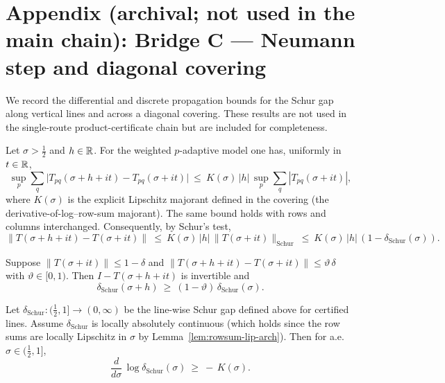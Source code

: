 
\section*{Appendix (archival; not used in the main chain): Bridge C — Neumann step and diagonal covering}

We record the differential and discrete propagation bounds for the Schur gap along vertical lines and across a diagonal covering. These results are not used in the single-route product-certificate chain but are included for completeness.

\begin{lemma}\label{lem:rowsum-lip-arch}
Let $\sigma>\tfrac12$ and $h\in\mathbb{R}$. For the weighted $p$-adaptive model one has, uniformly in $t\in\mathbb{R}$,
\[
  \sup_p \sum_q \big| T_{pq}(\sigma+h+it)-T_{pq}(\sigma+it)\big|\ \le\ K(\sigma)\,|h|\,\sup_p \sum_q |T_{pq}(\sigma+it)|,
\]
where $K(\sigma)$ is the explicit Lipschitz majorant defined in the covering (the derivative-of-log--row-sum majorant). The same bound holds with rows and columns interchanged. Consequently, by Schur's test,
\[
  \|T(\sigma+h+it)-T(\sigma+it)\|\ \le\ K(\sigma)\,|h|\,\|T(\sigma+it)\|_{\mathrm{Schur}}\ \le\ K(\sigma)\,|h|\,(1-\delta_{\mathrm{Schur}}(\sigma)).
\]
\end{lemma}

\begin{lemma}\label{lem:neumann-step}
Suppose $\|T(\sigma+it)\|\le 1-\delta$ and $\|T(\sigma+h+it)-T(\sigma+it)\|\le \vartheta\,\delta$ with $\vartheta\in[0,1)$. Then $I-T(\sigma+h+it)$ is invertible and
\[
  \delta_{\mathrm{Schur}}(\sigma+h)\ \ge\ (1-\vartheta)\,\delta_{\mathrm{Schur}}(\sigma).
\]
\end{lemma}

\begin{proposition}\label{prop:diff-bridgeC}
Let $\delta_{\mathrm{Schur}}:(\tfrac12,1]\to(0,\infty)$ be the line-wise Schur gap defined above for certified lines. Assume $\delta_{\mathrm{Schur}}$ is locally absolutely continuous (which holds since the row sums are locally Lipschitz in $\sigma$ by Lemma~\ref{lem:rowsum-lip-arch}). Then for a.e. $\sigma\in(\tfrac12,1]$,
\[
  \frac{d}{d\sigma}\,\log \delta_{\mathrm{Schur}}(\sigma)\ \ge\ -\,K(\sigma).
\]
\end{proposition}

